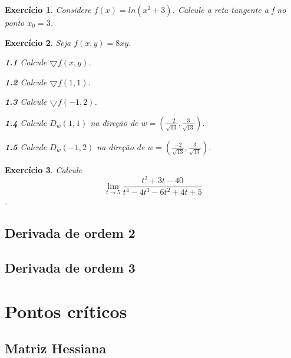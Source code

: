 \documentclass{book}
\newtheorem{defn}{Definição}
\numberwithin{defn}{chapter}
\numberwithin{exe}{chapter}
\numberwithin{ex}{chapter}
\numberwithin{obs}{chapter}
\numberwithin{fato}{chapter}
\numberwithin{resp}{chapter}
\newtheorem{exp1}{Exercício}
\begin{document}
\begin{exp1} Considere $f(x)=ln(x^2+3)$. Calcule a reta tangente a f no ponto $x_0=3$.\end{exp1}

\begin{exp1} Seja $f(x,y)=8xy$.
\item\textbf{1.1} Calcule $\bigtriangledown f(x,y)$.
\item\textbf{1.2} Calcule $\bigtriangledown f(1,1)$.
\item\textbf{1.3} Calcule $\bigtriangledown f(-1,2)$.
\item\textbf{1.4} Calcule $D_w(1,1)$ na direção de $w=\left(\frac{-2}{\sqrt{13}},\frac{3}{\sqrt{13}}\right)$.
\item\textbf{1.5} Calcule $D_w(-1,2)$ na direção de $w=\left(\frac{-2}{\sqrt{13}},\frac{3}{\sqrt{13}}\right)$.
\end{exp1}

\begin{exp1} Calcule \[\lim\limits_{t\to 5}\frac{t^2+3t-40}{t^4-4t^3-6t^2+4t+5}\].\end{exp1}

\section{Derivada de ordem 2}

\section{Derivada de ordem 3}


\chapter{Pontos críticos}
\section{Matriz Hessiana}


    
\end{document}
